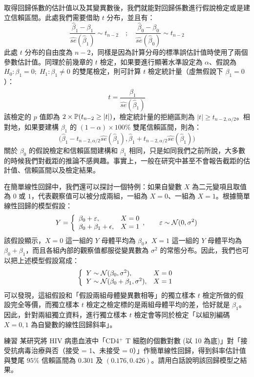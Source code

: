     取得回歸係數的估計值以及其變異數後，我們就能對回歸係數進行假說檢定或是建立信賴區間。此處我們需要借助 $t$ 分布，並且有：
    \[\frac{\hat{\beta}_1-\beta_1}{\widehat{se}(\hat{\beta}_1)} \sim t_{n-2} \quad ; \quad \frac{\hat{\beta}_0-\beta_0}{\widehat{se}(\hat{\beta}_0)} \sim t_{n-2}\]
    此處 $t$ 分布的自由度為 $n-2$，同樣是因為計算分母的標準誤估計值時使用了兩個參數估計值。同理於前幾章的 $t$ 檢定，如果要進行顯著水準設定為 $\alpha$、假說為 $H_0: \beta_1 = 0;\; H_1: \beta_1 \ne 0$ 的雙尾檢定，則可計算 $t$ 檢定統計量（虛無假說下 $\beta_1 = 0$）：
    \[t = \frac{\hat{\beta}_1}{\widehat{se}(\hat{\beta}_1)}\]
    該檢定的 $p$ 值即為 $2\times\mathbb{P}(t_{n-2} \ge |t|)$，檢定統計量的拒絕區則為 $|t| \ge t_{n-2, \alpha/2}$。相對地，如果要建構 $\beta_1$ 的 $(1-\alpha)\times 100\%$ 雙尾信賴區間，則為：
    \[\Big(\hat{\beta}_1 - t_{n-2, \alpha/2}\widehat{se}(\hat{\beta}_1), \hat{\beta}_1 + t_{n-2, \alpha/2}\widehat{se}(\hat{\beta}_1)\Big)\]
    關於 $\beta_0$ 的假說檢定和信賴區間建構和 $\beta_1$ 相同，只是如同我們之前所說，大多數的時候我們對截距的推論不感興趣。事實上，一般在研究中甚至不會報告截距的估計值、信賴區間以及檢定結果。

    在簡單線性回歸中，我們還可以探討一個特例：如果自變數 $X$ 為二元變項且取值為 $0$ 或 $1$，代表觀察值可以被分成兩組，一組為 $X=0$、一組為 $X=1$。根據簡單線性回歸的模型假設：
    \[Y = \left\{\begin{array}{lr}
        \beta_0 + \varepsilon, & X = 0\\
        \beta_0 + \beta_1 + \epsilon, & X = 1
    \end{array}, \qquad \varepsilon \sim \mathcal{N}(0, \sigma^2) \right.\]
    該假設顯示，$X=0$ 這一組的 $Y$ 母體平均為 $\beta_0$，$X=1$ 這一組的 $Y$ 母體平均為 $\beta_0 + \beta_1$，而且各組內部的觀察值都服從變異數為 $\sigma^2$ 的常態分布。因此，我們也可以把上述模型假設寫成：
    \[\left\{\begin{array}{lr}
        Y \sim \mathcal{N}(\beta_0,\sigma^2), & X = 0\\
        Y \sim \mathcal{N}(\beta_0 + \beta_1, \sigma^2), & X = 1
    \end{array} \right.\]
    可以發現，這組假設和「假設兩組母體變異數相等」的獨立樣本 $t$ 檢定所做的假設完全等價，而獨立樣本 $t$ 檢定之檢定標的是兩組母體平均的差，恰好就是 $\beta_1$。因此，針對兩組獨立資料，進行獨立樣本 $t$ 檢定會等同於檢定「以組別編碼 $X=0,1$ 為自變數的線性回歸斜率」。

    \bigskip

    \begin{custom}{練習}
       某研究將 HIV 病患血液中「CD4$^+$ T 細胞的個數對數 (以 10 為底)」對「接受抗病毒治療與否（接受 = 1、未接受 = 0）」作簡單線性回歸，得到斜率估計值與雙尾 $95\%$ 信賴區間為 $0.301$ 及 $(0.176,0.426)$。請用白話說明該回歸模型之結果。
    \end{custom}

